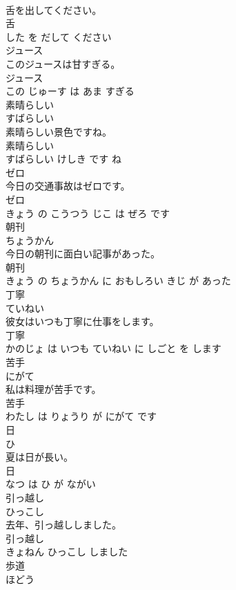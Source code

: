 \documentclass[8pt]{extreport}
\begin{document}
\begin{CJK}{UTF8}{min}
\\	舌を出してください。	
\\	舌 
\\	した を だして ください			
\\	ジュース	
\\	このジュースは甘すぎる。	
\\	ジュース 
\\	この じゅーす は あま すぎる			
\\	素晴らしい	
\\	すばらしい			
\\	素晴らしい景色ですね。	
\\	素晴らしい 
\\	すばらしい けしき です ね			
\\	ゼロ	
\\	今日の交通事故はゼロです。	
\\	ゼロ 
\\	きょう の こうつう じこ は ぜろ です			
\\	朝刊	
\\	ちょうかん			
\\	今日の朝刊に面白い記事があった。	
\\	朝刊 
\\	きょう の ちょうかん に おもしろい きじ が あった			
\\	丁寧	
\\	ていねい			
\\	彼女はいつも丁寧に仕事をします。	
\\	丁寧 
\\	かのじょ は いつも ていねい に しごと を します			
\\	苦手	
\\	にがて			
\\	私は料理が苦手です。	
\\	苦手 
\\	わたし は りょうり が にがて です			
\\	日	
\\	ひ			
\\	夏は日が長い。	
\\	日 
\\	なつ は ひ が ながい			
\\	引っ越し	
\\	ひっこし			
\\	去年、引っ越ししました。	
\\	引っ越し 
\\	きょねん ひっこし しました			
\\	歩道	
\\	ほどう			

\end{CJK}
\end{document}
